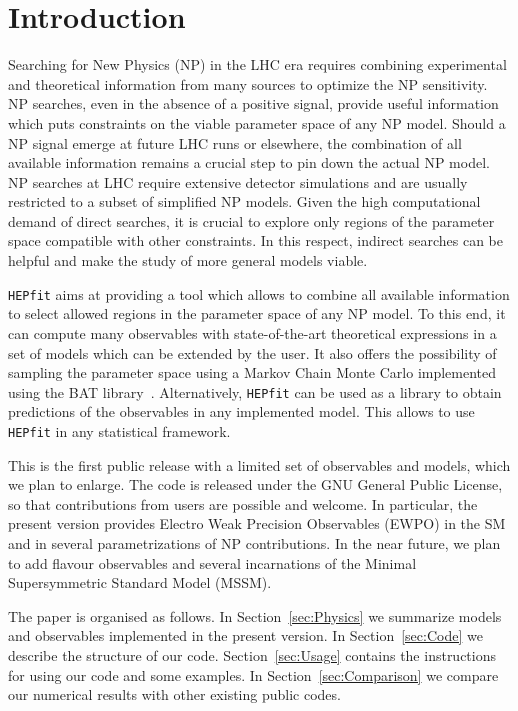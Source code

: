 \documentclass[preprint,3p,12pt]{elsarticle}
\newcommand{\HEPfit}{\texttt{HEPfit}\xspace}
\begin{document}
\section{Introduction}

Searching for New Physics (NP) in the LHC era requires combining
experimental and theoretical information from many sources to optimize
the NP sensitivity. NP searches, even in the absence of a positive
signal, provide useful information which puts constraints on the
viable parameter space of any NP model. Should a NP signal emerge at
future LHC runs or elsewhere, the combination of all available
information remains a crucial step to pin down the actual NP model.
NP searches at LHC require extensive detector simulations and are
usually restricted to a subset of simplified NP models. Given the high
computational demand of direct searches, it is crucial to explore only
regions of the parameter space compatible with other constraints. In
this respect, indirect searches can be helpful and make the study of
more general models viable.

\HEPfit aims at providing a tool which allows to combine all
available information to select allowed regions in the parameter space
of any NP model. To this end, it can compute many observables with
state-of-the-art theoretical expressions in a set of models which can
be extended by the user. It also offers the possibility of sampling
the parameter space using a Markov Chain Monte Carlo implemented using
the BAT library~\cite{arXiv:0808.2552}. Alternatively, \HEPfit can be
used as a library to obtain predictions of the observables in any
implemented model. This allows to use \HEPfit in any statistical
framework.

This is the first public release with a limited set of observables and
models, which we plan to enlarge. The code is released under the GNU
General Public License, so that contributions from users are possible
and welcome. In particular, the present version provides Electro Weak
Precision Observables (EWPO) in the SM and in several parametrizations
of NP contributions. In the near future, we plan to add flavour
observables and several incarnations of the Minimal Supersymmetric
Standard Model (MSSM).

The paper is organised as follows. In Section~\ref{sec:Physics} we
summarize models and observables implemented in the present
version. In Section~\ref{sec:Code} we describe the structure of our
code. Section~\ref{sec:Usage} contains the instructions for using our
code and some examples. In Section~\ref{sec:Comparison} we compare our
numerical results with other existing public codes.
\end{document}
